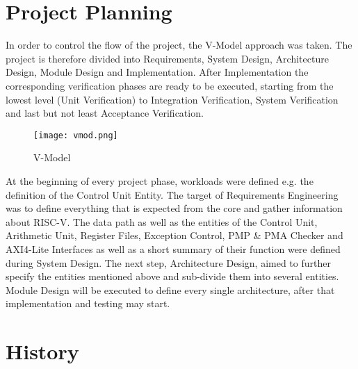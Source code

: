 \section{Project Planning}
In order to control the flow of the project, the V-Model approach was taken. The
project is therefore divided into Requirements, System Design, Architecture Design,
Module Design and Implementation. After Implementation the corresponding
verification phases are ready to be executed, starting from the lowest level (Unit
Verification) to Integration Verification, System Verification and last but not least
Acceptance Verification.


\begin{figure}[h]
	\centering
	\texttt{[image: vmod.png]}
	\caption{V-Model}
\end{figure}

At the beginning of every project phase, workloads were defined e.g. the definition of
the Control Unit Entity. The target of Requirements Engineering was to define
everything that is expected from the core and gather information about RISC-V. The
data path as well as the entities of the Control Unit, Arithmetic Unit, Register Files,
Exception Control, \acs{PMP} \& \acs{PMA} Checker and AXI4-Lite Interfaces as well as a short
summary of their function were defined during System Design. The next step,
Architecture Design, aimed to further specify the entities mentioned above and
sub-divide them into several entities. Module Design will be executed to define every
single architecture, after that implementation and testing may start.

\section{History}

